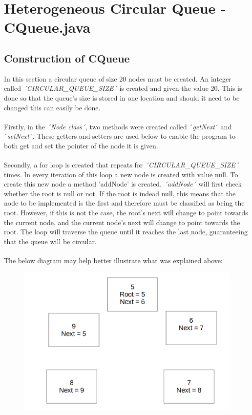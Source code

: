 \documentclass[12pt]{article}
\begin{document}
\section{Heterogeneous Circular Queue - CQueue.java}
\bigskip

\subsection{Construction of CQueue}
In this section a circular queue of size 20 nodes must be created. An integer called \emph{´CIRCULAR\_QUEUE\_SIZE´} is created and given the value 20. This is done so that the queue's size is stored in one location and should it need to be changed this can easily be done. \\
\\Firstly, in the \emph{´Node class´}, two methods were created called ´\emph{getNext}´ and ´\emph{setNext}´. These getters and setters are used below to enable the program to both get and set the pointer of the node it is given.\\
\\Secondly, a for loop is created that repeats for \emph{´CIRCULAR\_QUEUE\_SIZE´} times. In every iteration of this loop a new node is created with value null. To create this new node a method 'addNode' is created. \emph{´addNode´} will first check whether the root is null or not. If the root is indead null, this means that the node to be implemented is the first and therefore must be classified as being the root. However, if this is not the case, the root's next will change to point towards the current node, and the current node's next will change to point towards the root. The loop will traverse the queue until it reaches the last node, guaranteeing that the queue will be circular.\\
\\The below diagram may help better illustrate what was explained above:
\begin{figure}[h]
\centering
\includegraphics[scale=0.30]{Images/Insert.png}
\end{figure}
\bigskip
\end{document}
